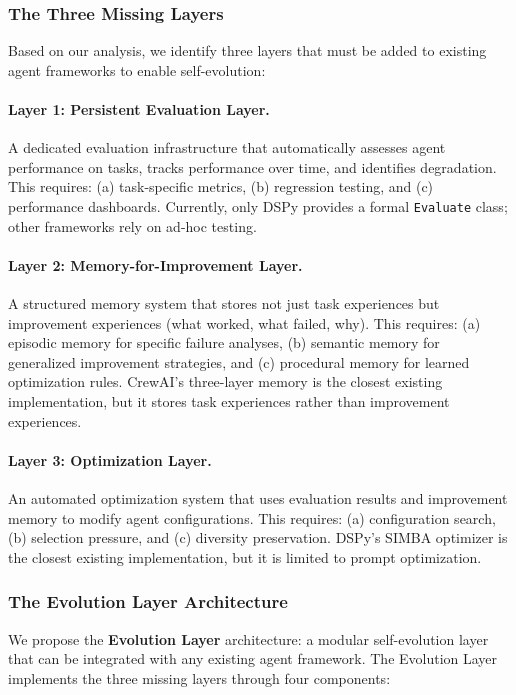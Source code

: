 \subsubsection{The Three Missing Layers}

Based on our analysis, we identify three layers that must be added to existing agent frameworks to enable self-evolution:

\paragraph{Layer 1: Persistent Evaluation Layer.}
A dedicated evaluation infrastructure that automatically assesses agent performance on tasks, tracks performance over time, and identifies degradation. This requires: (a) task-specific metrics, (b) regression testing, and (c) performance dashboards. Currently, only DSPy provides a formal \texttt{Evaluate} class; other frameworks rely on ad-hoc testing.

\paragraph{Layer 2: Memory-for-Improvement Layer.}
A structured memory system that stores not just task experiences but improvement experiences (what worked, what failed, why). This requires: (a) episodic memory for specific failure analyses, (b) semantic memory for generalized improvement strategies, and (c) procedural memory for learned optimization rules. CrewAI's three-layer memory is the closest existing implementation, but it stores task experiences rather than improvement experiences.

\paragraph{Layer 3: Optimization Layer.}
An automated optimization system that uses evaluation results and improvement memory to modify agent configurations. This requires: (a) configuration search, (b) selection pressure, and (c) diversity preservation. DSPy's SIMBA optimizer is the closest existing implementation, but it is limited to prompt optimization.

\subsubsection{The Evolution Layer Architecture}

We propose the \textbf{Evolution Layer} architecture: a modular self-evolution layer that can be integrated with any existing agent framework. The Evolution Layer implements the three missing layers through four components:

